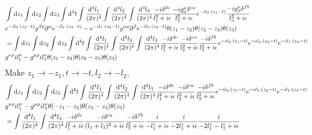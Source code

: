 \documentclass{article}
\DeclarePairedDelimiter\bracketM{[}{]}
\let\bqty\relax
\newcommand{\bqty}[1]{\bracketM*{#1}}
\newcommand{\mm}[1]{\frac{\dd^4#1}{(2\pi)^4}}
\begin{document}
\begin{align*}
	&\int\dd z_1\int\dd z_2\int\dd z_3\int\dd^4 t
	\int\mm{l_1}\int\mm{l_2}\int\mm{l_3}\frac{-i\delta^{dc}}{l_1^2+i\epsilon}\frac{-ig_{\alpha}^{\mu}\delta^{ea}}{l_2^2+i\epsilon}e^{-il_2\cdot(z_1-t)}\frac{-ig_{\beta}^{\nu}\delta^{fb}}{l_3^2+i\epsilon}\\&
	\bqty{e^{-il_3\cdot(z_2-t)}g^{\beta\rho}\partial^{\alpha}e^{-il_1\cdot(z_3-t)}-e^{-il_1\cdot(z_3-t)}g^{\alpha\rho}\partial^{\beta}e^{-il_3\cdot(z_2-t)}}
	\theta(z_1-z_2)\theta(z_2-z_3)\theta(z_3)\\ 
	&=\int\dd z_1\int\dd z_2\int\dd z_3\int\dd^4 t
	\int\mm{l_1}\int\mm{l_2}\int\mm{l_3}\frac{-i\delta^{dc}}{l_1^2+i\epsilon}\frac{-i\delta^{ea}}{l_2^2+i\epsilon}\frac{-i\delta^{fb}}{l_3^2+i\epsilon}e^{-il_2\cdot(z_1-t)}e^{-il_3\cdot(z_2-t)}e^{-il_1\cdot(z_3-t)}\\&
	\bqty{g^{\nu\rho}il_1^{\mu}-g^{\mu\rho}il_3^{\nu}}
	\theta(z_1-z_2)\theta(z_2-z_3)\theta(z_3)
\end{align*}
Make $z_1\to-z_1,t\to-t,l_2\to-l_2$, 
\begin{align*}
	&\int\dd z_1\int\dd z_2\int\dd z_3\int\dd^4 t
	\int\mm{l_1}\int\mm{l_2}\int\mm{l_3}\frac{-i\delta^{dc}}{l_1^2+i\epsilon}\frac{-i\delta^{ea}}{l_2^2+i\epsilon}\frac{-i\delta^{fb}}{l_3^2+i\epsilon}e^{-il_2\cdot(z_1-t)}e^{-il_3\cdot(z_2-t)}e^{-il_1\cdot(z_3-t)}\\&
	\bqty{g^{\nu\rho}il_1^{\mu}-g^{\mu\rho}il_3^{\nu}}
	\theta(-z_1-z_2)\theta(z_2-z_3)\theta(z_3)\\
	&=\int\mm{l_1}\int\mm{l_3}\frac{-i\delta^{dc}}{l_1^2+i\epsilon}\frac{-i\delta^{ea}}{(l_1+l_3)^2+i\epsilon}\frac{-i\delta^{fb}}{l_3^2+i\epsilon}\frac{i}{-l_1^z+i\epsilon}\frac{i}{-2l_1^z+i\epsilon}\frac{i}{-2l_1^z-l_3^z+i\epsilon}
\end{align*}
\end{document}
